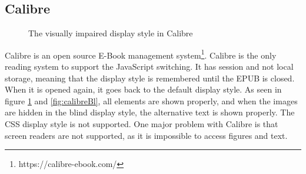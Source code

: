 \subsection{Calibre}
\begin{figure}[H]
	\centering
	\caption{The visually impaired display style in Calibre}
	\label{fig:calibreVi}
\end{figure}

Calibre is an open source E-Book management system\footnote{https://calibre-ebook.com/}. Calibre is the only reading system to support the JavaScript switching. It has session and not local storage, meaning that the display style is remembered until the EPUB is closed. When it is opened again, it goes back to the default display style. As seen in figure \ref{fig:calibreVi} and \ref{fig:calibreBl}, all elements are shown properly, and when the images are hidden in the blind display style, the alternative text is shown properly. The CSS display style is not supported. One major problem with Calibre is that screen readers are not supported, as it is impossible to access figures and text.

